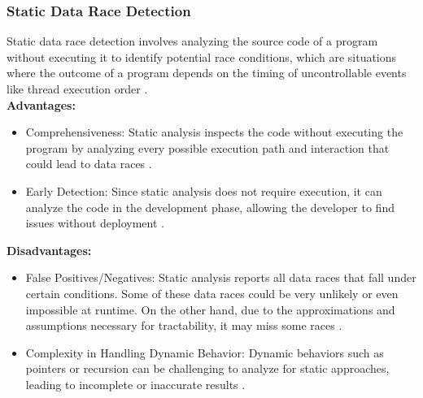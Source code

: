 \documentclass[
fancyheadings, %
%
%
]{stsreprt}
\begin{document}
{		\subsubsection{Static Data Race Detection}
		Static data race detection involves analyzing the source code of a program without executing it to identify potential race conditions, which are situations where the outcome of a program depends on the timing of uncontrollable events like thread execution order \cite{wang2020}. \\
		\textbf{Advantages:}
		\begin{itemize}
			\item Comprehensiveness: Static analysis inspects the code without executing the program by analyzing every possible execution path and interaction that could lead to data races \cite{wang2020}.
			\item Early Detection: Since static analysis does not require execution, it can analyze the code in the development phase, allowing the developer to find issues without deployment \cite{chen2011}.
		\end{itemize}
		\textbf{Disadvantages:}
		\begin{itemize}
			\item False Positives/Negatives: Static analysis reports all data races that fall under certain conditions. Some of these data races could be very unlikely or even impossible at runtime. On the other hand, due to the approximations and assumptions necessary for tractability, it may miss some races \cite{chen2011}.
			\item Complexity in Handling Dynamic Behavior: Dynamic behaviors such as pointers or recursion can be challenging to analyze for static approaches, leading to incomplete or inaccurate results \cite{wang2020}.
		\end{itemize}
		
}
\end{document}
